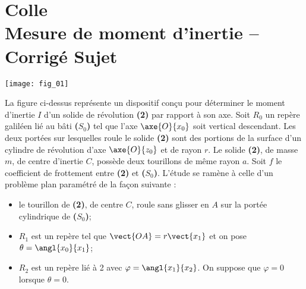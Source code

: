\chapter*{Colle  \\ 
Mesure de moment d'inertie -- \ifprof Corrigé \else Sujet \fi}

\iflivret {} \else
\ifprof  {} \else \fi
\fi

\setcounter{question}{0}



\begin{marginfigure}
\texttt{[image: fig\_01]}
\end{marginfigure}

La figure ci-dessus représente un dispositif conçu pour déterminer le moment d'inertie $I$ d'un solide de révolution \textbf{(2)} par rapport à son axe. Soit $R_0$ un repère galiléen lié au bâti \textbf{($S_0$)} tel que l'axe $\axe{O}{x_0}$ soit vertical descendant. Les deux portées sur lesquelles roule le solide \textbf{(2)} sont des portions de la surface d'un cylindre de révolution d'axe $\axe{O}{z_0}$ et de rayon $r$.
Le solide \textbf{(2)}, de masse $m$, de centre d'inertie $C$, possède deux tourillons de même rayon $a$. Soit $f$ le coefficient de frottement entre \textbf{(2)} et \textbf{($S_0$)}.
L'étude se ramène à celle d'un problème plan paramétré de la façon suivante :
\begin{itemize}
\item le tourillon de \textbf{(2)}, de centre $C$, roule sans glisser en $A$ sur la portée cylindrique de \textbf{($S_0$)};
\item $R_1$ est un repère tel que $\vect{OA} = r\vect{x_1}$ et on pose $\theta=\angl{x_0}{x_1}$;
\item $R_2$ est un repère lié à 2 avec $\varphi=\angl{x_1}{x_2}$. On suppose que $\varphi = 0$ lorsque $\theta=0$.
\end{itemize}

